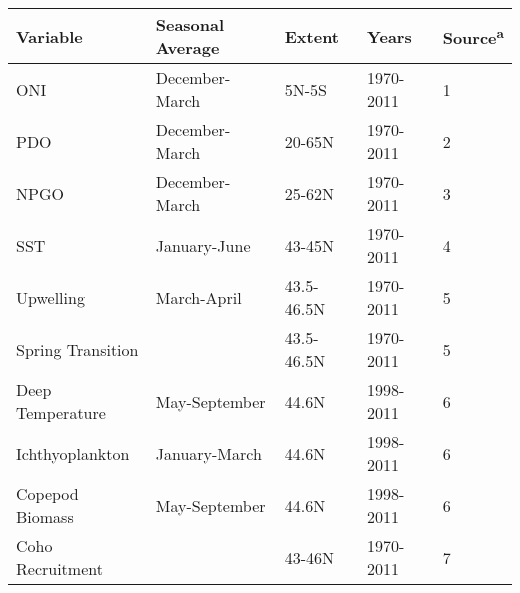 \begin{tabular}{lllll}
  \hline
Variable & Seasonal Average & Extent & Years & Source\textsuperscript{a} \\ 
  \hline
ONI & December-March & 5N-5S & 1970-2011 & 1 \\ 
  PDO & December-March & 20-65N & 1970-2011 & 2 \\ 
  NPGO & December-March & 25-62N & 1970-2011 & 3 \\ 
  SST & January-June & 43-45N & 1970-2011 & 4 \\ 
  Upwelling & March-April & 43.5-46.5N & 1970-2011 & 5 \\ 
  Spring Transition &  & 43.5-46.5N & 1970-2011 & 5 \\ 
  Deep Temperature & May-September & 44.6N & 1998-2011 & 6 \\ 
  Ichthyoplankton & January-March & 44.6N & 1998-2011 & 6 \\ 
  Copepod Biomass & May-September & 44.6N & 1998-2011 & 6 \\ 
  Coho Recruitment &  & 43-46N & 1970-2011 & 7 \\ 
   \hline
\end{tabular}
